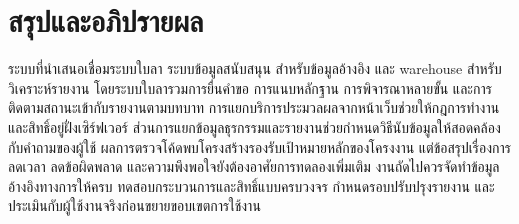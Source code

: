 \section{สรุปและอภิปรายผล}
ระบบที่นำเสนอเชื่อมระบบใบลา ระบบข้อมูลสนับสนุน สำหรับข้อมูลอ้างอิง และ warehouse สำหรับวิเคราะห์รายงาน โดยระบบใบลารวมการยื่นคำขอ การแนบหลักฐาน การพิจารณาหลายขั้น และการติดตามสถานะเข้ากับรายงานตามบทบาท การแยกบริการประมวลผลจากหน้าเว็บช่วยให้กฎการทำงานและสิทธิ์อยู่ฝั่งเซิร์ฟเวอร์ ส่วนการแยกข้อมูลธุรกรรมและรายงานช่วยกำหนดวิธีนับข้อมูลให้สอดคล้องกับคำถามของผู้ใช้
ผลการตรวจโค้ดพบโครงสร้างรองรับเป้าหมายหลักของโครงงาน แต่ข้อสรุปเรื่องการลดเวลา ลดข้อผิดพลาด และความพึงพอใจยังต้องอาศัยการทดลองเพิ่มเติม งานถัดไปควรจัดทำข้อมูลอ้างอิงทางการให้ครบ ทดสอบกระบวนการและสิทธิ์แบบครบวงจร กำหนดรอบปรับปรุงรายงาน และประเมินกับผู้ใช้งานจริงก่อนขยายขอบเขตการใช้งาน

